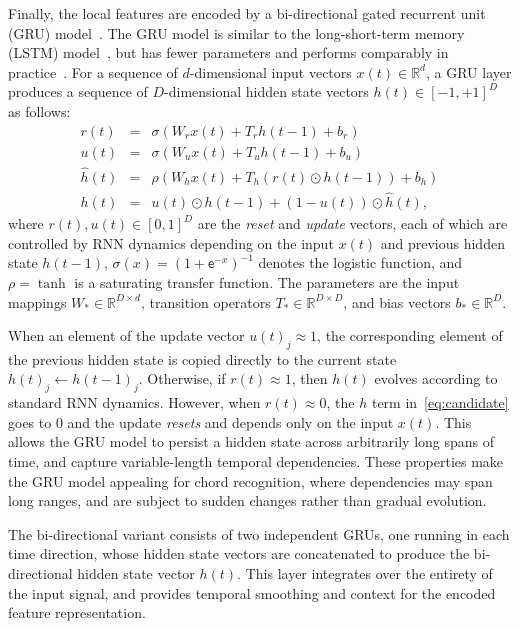 \documentclass{article}
\begin{document}
Finally, the local features are encoded by a bi-directional gated recurrent unit (GRU) model~\cite{cho2014learning}.
The GRU model is similar to the long-short-term memory (LSTM) model~\cite{hochreiter1997long}, but has fewer parameters and performs comparably in practice~\cite{jozefowicz2015empirical}.
For a sequence of $d$-dimensional input vectors $x(t) \in \mathbb{R}^d$, a GRU layer produces a sequence of $D$-dimensional hidden state vectors $h(t) \in {[-1, +1]}^D$ as follows:
\begin{eqnarray}
    r(t) &=& \sigma\left(W_r x(t) + T_r h(t-1) + b_r\right)\\
    u(t) &=& \sigma\left(W_u x(t) + T_u h(t-1) + b_u\right)\\
    \hat{h}(t) &=& \rho\left(W_h x(t) + T_h \left( r(t) \odot h(t-1) \right) + b_h \right)\label{eq:candidate}\\
    h(t) &=& u(t) \odot h(t-1) + (1-u(t)) \odot \hat{h}(t),
\end{eqnarray}
where $r(t), u(t) \in {[0,1]}^D$ are the \emph{reset} and \emph{update} vectors, each of which are controlled by RNN dynamics depending on the input $x(t)$ and previous hidden state $h(t-1)$, ${\sigma(x)={(1+\mathsf{e}^{-x})}^{-1}}$ denotes the logistic function, and $\rho = \tanh$ is a saturating transfer function.
The parameters are the input mappings $W_* \in \mathbb{R}^{D\times d}$, transition operators $T_* \in \mathbb{R}^{D\times D}$, and bias vectors $b_* \in \mathbb{R}^D$.

When an element of the update vector ${u(t)}_j \approx 1$, the corresponding element of the previous hidden state is copied directly to the current state ${h(t)}_j \leftarrow {h(t-1)}_j$.
Otherwise, if $r(t) \approx 1$, then $h(t)$ evolves according to standard RNN dynamics.
However, when $r(t) \approx 0$, the $h$ term in~\eqref{eq:candidate} goes to 0 and the update \emph{resets} and depends only on the input $x(t)$.
This allows the GRU model to persist a hidden state across arbitrarily long spans of time, and capture variable-length temporal dependencies.
These properties make the GRU model appealing for chord recognition, where dependencies may span long ranges, and are subject to sudden changes rather than gradual evolution.

The bi-directional variant consists of two independent GRUs, one running in each time direction, whose hidden state vectors are concatenated to produce the bi-directional hidden state vector $h(t)$.
This layer integrates over the entirety of the input signal, and provides temporal smoothing and context for the encoded feature representation.
\end{document}
